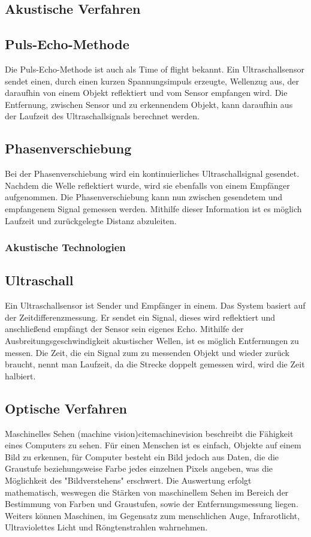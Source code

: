     \subsection{Akustische Verfahren}
    \subsection*{Puls-Echo-Methode}
    Die Puls-Echo-Methode\cite{akustischeverfahren} ist auch als Time of flight bekannt.
    Ein Ultraschallsensor sendet einen, durch einen kurzen Spannungsimpuls erzeugte, Wellenzug aus, der daraufhin von einem Objekt reflektiert und vom Sensor empfangen wird. Die Entfernung, zwischen Sensor und zu erkennendem Objekt, kann daraufhin aus der Laufzeit des Ultraschallsignals berechnet werden. 

    \subsection*{Phasenverschiebung}
    Bei der Phasenverschiebung\cite{akustischeverfahren} wird ein kontinuierliches Ultraschallsignal gesendet. Nachdem die Welle reflektiert wurde, wird sie ebenfalls von einem Empfänger aufgenommen. Die Phasenverschiebung kann nun zwischen gesendetem und empfangenem Signal gemessen werden. Mithilfe dieser Information ist es möglich Laufzeit und zurückgelegte Distanz abzuleiten. 

    \subsubsection{Akustische Technologien}
    \subsection*{Ultraschall}
    Ein Ultraschallsensor ist Sender und Empfänger in einem. Das System basiert auf der Zeitdifferenzmessung. Er sendet ein Signal, dieses wird reflektiert und anschließend empfängt der Sensor sein eigenes Echo. Mithilfe der Ausbreitungsgeschwindigkeit akustischer Wellen, ist es möglich Entfernungen zu messen. Die Zeit, die ein Signal zum zu messenden Objekt und wieder zurück braucht, nennt man Laufzeit, da die Strecke doppelt gemessen wird, wird die Zeit halbiert.

    \subsection{Optische Verfahren}
    Maschinelles Sehen (machine vision)cite{machinevision} \cite{machinevision2} beschreibt die Fähigkeit eines Computers zu sehen.
    Für einen Menschen ist es einfach, Objekte auf einem Bild zu erkennen, für Computer besteht ein Bild jedoch aus Daten, die die Graustufe beziehungsweise Farbe jedes einzelnen Pixels angeben, was die Möglichkeit des "Bildverstehens" erschwert.
    Die Auswertung erfolgt mathematisch, weswegen die Stärken von maschinellem Sehen im Bereich der Bestimmung von Farben und Graustufen, sowie der Entfernungsmessung liegen. Weiters können Maschinen, im Gegensatz zum menschlichen Auge, Infrarotlicht, Ultraviolettes Licht und Röngtenstrahlen wahrnehmen.


